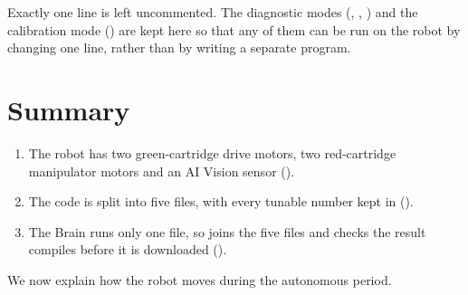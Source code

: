 Exactly one line is left uncommented. The diagnostic modes
(, , ) and the
calibration mode () are kept here so that any of them can be
run on the robot by changing one line, rather than by writing a separate
program.

\section{Summary}

\begin{enumerate}
  \item The robot has two green-cartridge drive motors, two red-cartridge
    manipulator motors and an AI Vision sensor ().
  \item The code is split into five files, with every tunable number kept in
     ().
  \item The Brain runs only one file, so  joins the five files
    and checks the result compiles before it is downloaded ().
\end{enumerate}

We now explain how the robot moves during the autonomous period.
